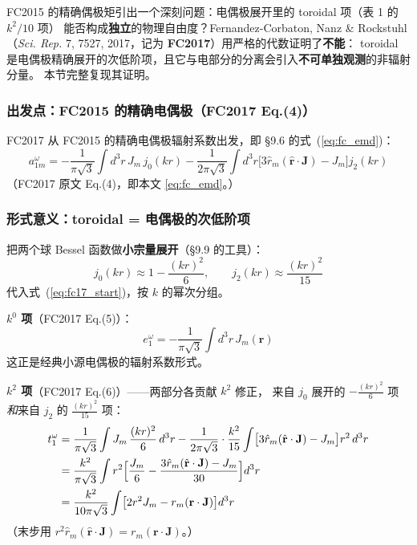 FC2015 的精确偶极矩引出一个深刻问题：电偶极展开里的 toroidal 项（表 1 的 $k^2/10$ 项）
能否构成\textbf{独立}的物理自由度？Fernandez-Corbaton, Nanz \& Rockstuhl
（\textit{Sci. Rep.} 7, 7527, 2017，记为 \textbf{FC2017}）用严格的代数证明了\textbf{不能}：
toroidal 是电偶极精确展开的次低阶项，且它与电部分的分离会引入\textbf{不可单独观测}的非辐射分量。
本节完整复现其证明。

\subsubsection{出发点：FC2015 的精确电偶极（FC2017 Eq.(4)）}

FC2017 从 FC2015 的精确电偶极辐射系数出发，即 \S9.6 的式~(\ref{eq:fc_emd})：
\begin{equation}
  a^\omega_{1m} = -\frac{1}{\pi\sqrt{3}}\int d^3r\,J_m\,j_0(kr)
    - \frac{1}{2\pi\sqrt{3}}\int d^3r\bigl[3\hat{r}_m(\hat{\mathbf{r}}\cdot\mathbf{J}) - J_m\bigr]j_2(kr)
  \label{eq:fc17_start}
\end{equation}
（FC2017 原文 Eq.(4)，即本文 \ref{eq:fc_emd}。）

\subsubsection{形式意义：toroidal = 电偶极的次低阶项}

把两个球 Bessel 函数做\textbf{小宗量展开}（\S9.9 的工具）：
\begin{equation}
  j_0(kr) \approx 1 - \frac{(kr)^2}{6},\qquad
  j_2(kr) \approx \frac{(kr)^2}{15}
\end{equation}
代入式~(\ref{eq:fc17_start})，按 $k$ 的幂次分组。

\textbf{$k^0$ 项}（FC2017 Eq.(5)）：
\begin{equation}
  e^\omega_1 = -\frac{1}{\pi\sqrt{3}}\int d^3r\,J_m(\mathbf{r})
\end{equation}
这正是经典小源电偶极的辐射系数形式。

\textbf{$k^2$ 项}（FC2017 Eq.(6)）——两部分各贡献 $k^2$ 修正，
来自 $j_0$ 展开的 $-\frac{(kr)^2}{6}$ 项 \emph{和}来自 $j_2$ 的 $\frac{(kr)^2}{15}$ 项：
\begin{align}
  t^\omega_1 &= \frac{1}{\pi\sqrt{3}}\int J_m\,\frac{(kr)^2}{6}\,d^3r
    - \frac{1}{2\pi\sqrt{3}}\cdot\frac{k^2}{15}\int\bigl[3\hat{r}_m(\hat{\mathbf{r}}\cdot\mathbf{J}) - J_m\bigr]r^2\,d^3r \notag\\
  &= \frac{k^2}{\pi\sqrt{3}}\int r^2\Bigl[\frac{J_m}{6} - \frac{3\hat{r}_m(\hat{\mathbf{r}}\cdot\mathbf{J}) - J_m}{30}\Bigr]d^3r \notag\\
  &= \frac{k^2}{10\pi\sqrt{3}}\int\bigl[2r^2J_m - r_m(\mathbf{r}\cdot\mathbf{J})\bigr]d^3r
  \label{eq:fc17_t1}
\end{align}
（末步用 $r^2\hat{r}_m(\hat{\mathbf{r}}\cdot\mathbf{J}) = r_m(\mathbf{r}\cdot\mathbf{J})$。）

